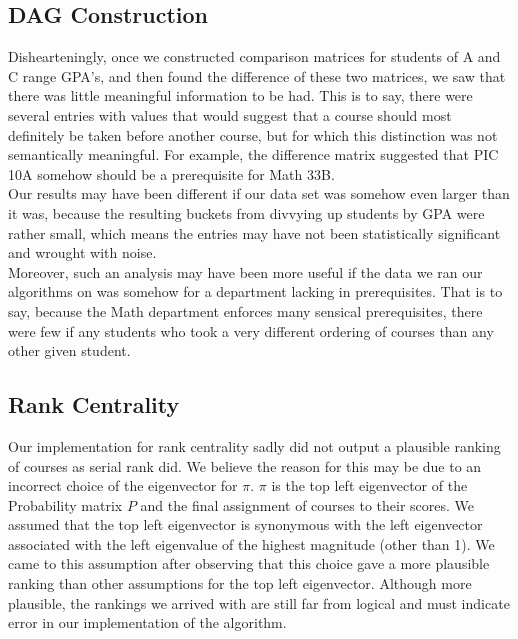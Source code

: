 \documentclass[10pt]{siamltex}
\begin{document}
\begin{pagewiselinenumbers}
\subsection{DAG Construction}
Dishearteningly, once we constructed comparison matrices for students of A and C range GPA's, and then found the difference of these two matrices, we saw that there was little meaningful information to be had. This is to say, there were several entries with values that would suggest that a course should most definitely be taken before another course, but for which this distinction was not semantically meaningful. For example, the difference matrix suggested that PIC 10A somehow should be a prerequisite for Math 33B.\\

Our results may have been different if our data set was somehow even larger than it was, because the resulting buckets from divvying up students by GPA were rather small, which means the entries may have not been statistically significant and wrought with noise.\\

Moreover, such an analysis may have been more useful if the data we ran our algorithms on was somehow for a department lacking in prerequisites. That is to say, because the Math department enforces many sensical prerequisites, there were few if any students who took a very different ordering of courses than any other given student.

\subsection{Rank Centrality}
Our implementation for rank centrality sadly did not output a plausible ranking of courses as serial rank did. We believe the reason for this may be due to an incorrect choice of the eigenvector for $\pi$. $\pi$ is the top left eigenvector of the Probability matrix $P$ and the final assignment of courses to their scores. We assumed that the top left eigenvector is synonymous with the left eigenvector associated with the left eigenvalue of the highest magnitude (other than 1). We came to this assumption after observing that this choice gave a more plausible ranking than other assumptions for the top left eigenvector. Although more plausible, the rankings we arrived with are still far from logical and must indicate error in our implementation of the algorithm.




\end{pagewiselinenumbers}
\end{document}
